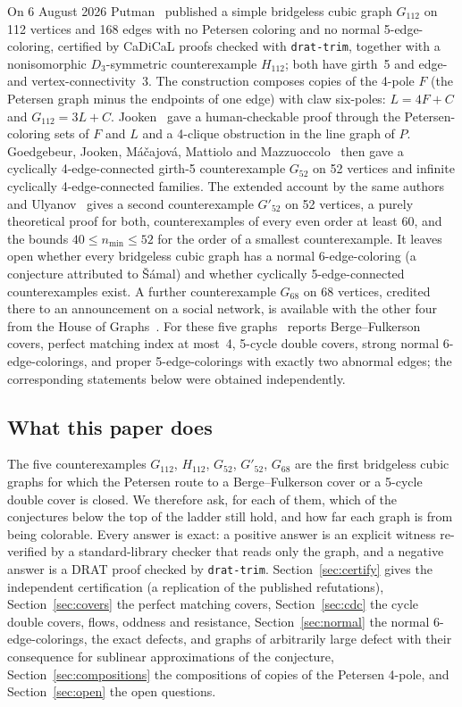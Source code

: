 \documentclass[11pt]{article}
\theoremstyle{definition}
\theoremstyle{remark}
\newcommand{\PG}{P}
\newcommand{\Gmain}{G_{112}}
\newcommand{\Gsym}{H_{112}}
\newcommand{\Gfty}{G_{52}}
\newcommand{\Gftyb}{G'_{52}}
\newcommand{\Gsix}{G_{68}}
\begin{document}
On 6 August 2026 Putman~\cite{Putman2026} published a simple bridgeless cubic graph $\Gmain$ on
112 vertices and 168 edges with no Petersen coloring and no normal 5-edge-coloring, certified by
CaDiCaL proofs checked with \texttt{drat-trim}, together with a nonisomorphic $D_3$-symmetric
counterexample $\Gsym$; both have girth~5 and edge- and vertex-connectivity~3. The construction
composes copies of the 4-pole $F$ (the Petersen graph minus the endpoints of one edge) with claw
six-poles: $L = 4F + C$ and $\Gmain = 3L + C$. Jooken~\cite{Jooken2026} gave a human-checkable
proof through the Petersen-coloring sets of $F$ and $L$ and a 4-clique obstruction in the line
graph of $\PG$. Goedgebeur, Jooken, M\'a\v{c}ajov\'a, Mattiolo and Mazzuoccolo~\cite{GJMMM2026}
then gave a cyclically 4-edge-connected girth-5 counterexample $\Gfty$ on 52 vertices and infinite
cyclically 4-edge-connected families. The extended account by the same authors and
Ulyanov~\cite{GJMMMU2026} gives a second counterexample $\Gftyb$ on 52 vertices, a purely
theoretical proof for both, counterexamples of every even order at least 60, and the bounds
$40 \le n_{\min} \le 52$ for the order of a smallest counterexample. It leaves open whether every
bridgeless cubic graph has a normal 6-edge-coloring (a conjecture attributed to \v{S}\'amal) and
whether cyclically 5-edge-connected counterexamples exist. A further counterexample $\Gsix$ on 68
vertices, credited there to an announcement on a social network, is available with the other
four from the House of Graphs~\cite{HoG}. For these five graphs~\cite{GJMMMU2026} reports
Berge--Fulkerson covers, perfect matching index at most~4, 5-cycle double covers, strong normal
6-edge-colorings, and proper 5-edge-colorings with exactly two abnormal edges; the corresponding
statements below were obtained independently.

\subsection{What this paper does}

The five counterexamples $\Gmain$, $\Gsym$, $\Gfty$, $\Gftyb$, $\Gsix$ are the first bridgeless
cubic graphs for which the
Petersen route to a Berge--Fulkerson cover or a 5-cycle double cover is closed. We therefore
ask, for each of them, which of the conjectures below the top of the
ladder still hold, and how far each graph is from being colorable. Every answer is exact: a
positive answer is an explicit witness re-verified by a standard-library checker that reads only
the graph, and a negative answer is a DRAT proof checked by \texttt{drat-trim}.
Section~\ref{sec:certify} gives the independent certification (a replication of the published
refutations), Section~\ref{sec:covers} the perfect matching covers, Section~\ref{sec:cdc} the
cycle double covers, flows, oddness and resistance, Section~\ref{sec:normal} the normal
6-edge-colorings, the exact defects, and graphs of arbitrarily large defect with their
consequence for sublinear approximations of the conjecture, Section~\ref{sec:compositions} the
compositions of
copies of the Petersen 4-pole, and Section~\ref{sec:open} the open questions.
\end{document}
